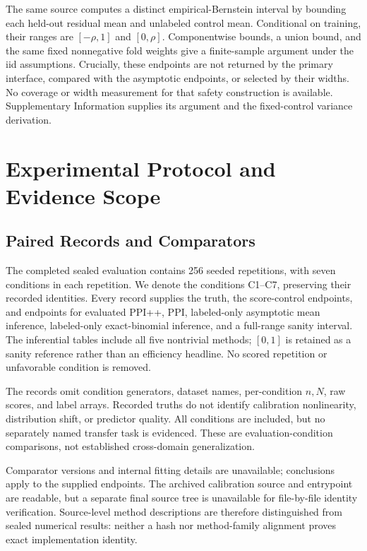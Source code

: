 \documentclass{article}
\begin{document}
The same source computes a distinct empirical-Bernstein interval by bounding each held-out residual mean and unlabeled control mean. Conditional on training, their ranges are $[-\rho,1]$ and $[0,\rho]$. Componentwise bounds, a union bound, and the same fixed nonnegative fold weights give a finite-sample argument under the iid assumptions. Crucially, these endpoints are not returned by the primary interface, compared with the asymptotic endpoints, or selected by their widths. No coverage or width measurement for that safety construction is available. Supplementary Information supplies its argument and the fixed-control variance derivation.

\section{Experimental Protocol and Evidence Scope}
\subsection{Paired Records and Comparators}
The completed sealed evaluation contains 256 seeded repetitions, with seven conditions in each repetition. We denote the conditions C1--C7, preserving their recorded identities. Every record supplies the truth, the score-control endpoints, and endpoints for evaluated PPI++, PPI, labeled-only asymptotic mean inference, labeled-only exact-binomial inference, and a full-range sanity interval. The inferential tables include all five nontrivial methods; $[0,1]$ is retained as a sanity reference rather than an efficiency headline. No scored repetition or unfavorable condition is removed.

The records omit condition generators, dataset names, per-condition $n,N$, raw scores, and label arrays. Recorded truths do not identify calibration nonlinearity, distribution shift, or predictor quality. All conditions are included, but no separately named transfer task is evidenced. These are evaluation-condition comparisons, not established cross-domain generalization.

Comparator versions and internal fitting details are unavailable; conclusions apply to the supplied endpoints. The archived calibration source and entrypoint are readable, but a separate final source tree is unavailable for file-by-file identity verification. Source-level method descriptions are therefore distinguished from sealed numerical results: neither a hash nor method-family alignment proves exact implementation identity.
\end{document}
